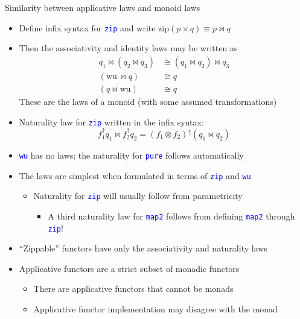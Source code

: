 \documentclass[english]{beamer}
\begin{document}
\begin{frame}{Similarity between applicative laws and monoid laws}
\begin{itemize}
\item Define infix syntax for \texttt{\textcolor{blue}{\footnotesize{}zip}}
and write $\text{zip}\left(p\times q\right)\equiv p\bowtie q$
\item Then the associativity and identity laws may be written as{\footnotesize{}
\begin{align*}
q_{1}\bowtie\left(q_{2}\bowtie q_{3}\right) & \cong\left(q_{1}\bowtie q_{2}\right)\bowtie q_{3}\\
\left(\text{wu}\,\bowtie q\right) & \cong q\\
\left(q\bowtie\text{wu}\right) & \cong q
\end{align*}
}These are the laws of a monoid (with some assumed transformations)
\item Naturality law for \texttt{\textcolor{blue}{\footnotesize{}zip}} written
in the infix syntax:{\footnotesize{}
\[
f_{1}^{\uparrow}q_{1}\bowtie f_{2}^{\uparrow}q_{2}=\left(f_{1}\otimes f_{2}\right)^{\uparrow}\left(q_{1}\bowtie q_{2}\right)
\]
}{\footnotesize \par}
\item \texttt{\textcolor{blue}{\footnotesize{}wu}} has no laws; the naturality
for \texttt{\textcolor{blue}{\footnotesize{}pure}} follows automatically
\item The laws are simplest when formulated in terms of \texttt{\textcolor{blue}{\footnotesize{}zip}}
and \texttt{\textcolor{blue}{\footnotesize{}wu}} 
\begin{itemize}
\item Naturality for \texttt{\textcolor{blue}{\footnotesize{}zip}} will
usually follow from parametricity
\begin{itemize}
\item A third naturality law for \texttt{\textcolor{blue}{\footnotesize{}map2}}
follows from defining \texttt{\textcolor{blue}{\footnotesize{}map2}}
through \texttt{\textcolor{blue}{\footnotesize{}zip}}!
\end{itemize}
\end{itemize}
\item ``Zippable'' functors have only the associativity and naturality
laws
\item Applicative functors are a strict subset of monadic functors
\begin{itemize}
\item There are applicative functors that cannot be monads
\item Applicative functor implementation may disagree with the monad
\end{itemize}
\end{itemize}
\end{frame}
\end{document}
